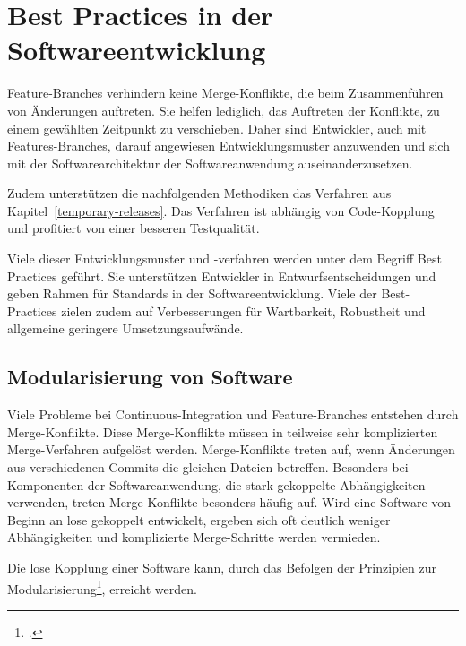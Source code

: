 \section{Best Practices in der Softwareentwicklung}

Feature-Branches verhindern keine Merge-Konflikte, die beim Zusammenführen von Änderungen auftreten. Sie helfen lediglich, das Auftreten der Konflikte, zu einem gewählten Zeitpunkt zu verschieben. Daher sind Entwickler, auch mit Features-Branches, darauf angewiesen Entwicklungsmuster anzuwenden und sich mit der Softwarearchitektur der Softwareanwendung auseinanderzusetzen.

Zudem unterstützen die nachfolgenden Methodiken das Verfahren \glqq {}\grqq{} aus Kapitel~\ref{temporary-releases}. Das Verfahren ist abhängig von Code-Kopplung und profitiert von einer besseren Testqualität.

Viele dieser Entwicklungsmuster und -verfahren werden unter dem Begriff \glqq Best Practices\grqq{} geführt. Sie unterstützen Entwickler in Entwurfsentscheidungen und geben Rahmen für Standards in der Softwareentwicklung. Viele der Best-Practices zielen zudem auf Verbesserungen für Wartbarkeit, Robustheit und allgemeine geringere Umsetzungsaufwände.

\subsection{Modularisierung von Software}

Viele Probleme bei Continuous-Integration und Feature-Branches entstehen durch Merge-Konflikte. Diese Merge-Konflikte müssen in teilweise sehr komplizierten Merge-Verfahren aufgelöst werden. Merge-Konflikte treten auf, wenn Änderungen aus verschiedenen Commits die gleichen Dateien betreffen. Besonders bei Komponenten der Softwareanwendung, die stark gekoppelte Abhängigkeiten verwenden, treten Merge-Konflikte besonders häufig auf. Wird eine Software von Beginn an lose gekoppelt entwickelt, ergeben sich oft deutlich weniger Abhängigkeiten und komplizierte Merge-Schritte werden vermieden.

Die lose Kopplung einer Software kann, durch das Befolgen der Prinzipien zur Modularisierung\footcite{2012-barth-modularisation}, erreicht werden. 

